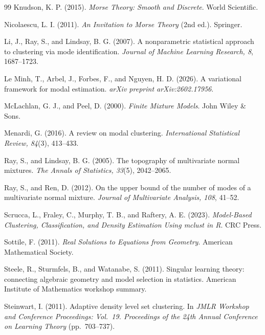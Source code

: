 \documentclass[11pt]{article}
\theoremstyle{plain}
\theoremstyle{definition}
\theoremstyle{remark}
\numberwithin{equation}{section}
\begin{document}
\begin{thebibliography}{99}
Knudson, K. P. (2015).
\textit{Morse Theory: Smooth and Discrete}.
World Scientific.


Nicolaescu, L. I. (2011).
\textit{An Invitation to Morse Theory} (2nd ed.).
Springer.

Li, J., Ray, S., and Lindsay, B. G. (2007).
A nonparametric statistical approach to clustering via mode identification.
\textit{Journal of Machine Learning Research, 8}, 1687--1723.

Le Minh, T., Arbel, J., Forbes, F., and Nguyen, H. D. (2026).
A variational framework for modal estimation.
\textit{arXiv preprint arXiv:2602.17956}.

McLachlan, G. J., and Peel, D. (2000).
\textit{Finite Mixture Models}.
John Wiley \& Sons.

Menardi, G. (2016).
A review on modal clustering.
\textit{International Statistical Review, 84}(3), 413--433.

Ray, S., and Lindsay, B. G. (2005).
The topography of multivariate normal mixtures.
\textit{The Annals of Statistics, 33}(5), 2042--2065.

Ray, S., and Ren, D. (2012).
On the upper bound of the number of modes of a multivariate normal mixture.
\textit{Journal of Multivariate Analysis, 108}, 41--52.

Scrucca, L., Fraley, C., Murphy, T. B., and Raftery, A. E. (2023).
\textit{Model-Based Clustering, Classification, and Density Estimation Using mclust in R}.
CRC Press.

Sottile, F. (2011).
\textit{Real Solutions to Equations from Geometry}.
American Mathematical Society.

Steele, R., Sturmfels, B., and Watanabe, S. (2011).
Singular learning theory: connecting algebraic geometry and model selection in statistics.
American Institute of Mathematics workshop summary.

Steinwart, I. (2011).
Adaptive density level set clustering.
In \textit{JMLR Workshop and Conference Proceedings: Vol.~19. Proceedings of the 24th Annual Conference on Learning Theory} (pp.~703--737).

\end{thebibliography}
\end{document}

